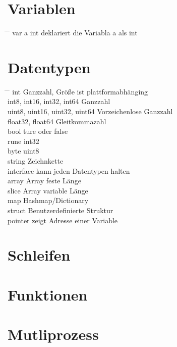 \documentclass[a4paper,12pt,twoside]{article}
\begin{document}
\section{Variablen}
\begin{tabbing}
 \hspace{2mm} \= \hspace{50mm} \= \kill
 \> var a int \> deklariert die Variabla a als int
\end{tabbing}

\section{Datentypen}
\begin{tabbing}
 \hspace{2mm} \= \hspace{50mm} \= \kill
 \> int \> Ganzzahl, Größe ist plattformabhänging \\
 \> int8, int16, int32, int64 \> Ganzzahl \\
 \> uint8, uint16, uint32, uint64 \> Vorzeichenlose Ganzzahl \\
 \> float32, float64 \> Gleitkommazahl \\ 
 \> bool \> ture oder false \\ 
 \> rune \> int32 \\ 
 \> byte \> uint8 \\
 \> string \> Zeichnkette \\ 
 \> interface{} \> kann jeden Datentypen halten \\
 \> array \> Array feste Länge \\ 
 \> slice \> Array variable Länge \\ 
 \> map \> Hashmap/Dictionary \\ 
 \> struct \> Benutzerdefinierte Struktur \\ 
 \> pointer \> zeigt Adresse einer Variable \\
\end{tabbing}

\section{Schleifen}
\section{Funktionen}
\section{Mutliprozess}
\end{document}
